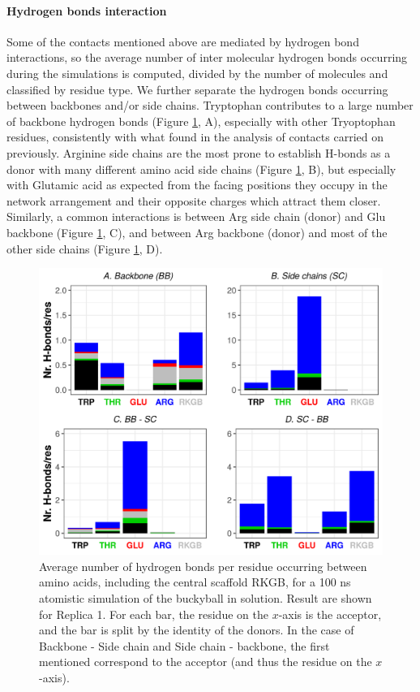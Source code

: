 \paragraph{Hydrogen bonds interaction} Some of the contacts mentioned above are mediated by hydrogen bond interactions, so the average number of inter molecular hydrogen bonds occurring during the simulations is computed, divided by the number of molecules and classified by residue type.
We further separate the hydrogen bonds occurring between backbones and/or side chains. Tryptophan contributes to a large number of backbone hydrogen bonds (Figure \ref{fig:BTI_hbonds}, A), especially with other Tryoptophan residues, consistently with what found in the analysis of contacts carried on previously. Arginine side chains are the most prone to establish H-bonds as a donor with many different amino acid side chains (Figure \ref{fig:BTI_hbonds}, B), but especially with Glutamic acid as expected from the facing positions they occupy in the network arrangement and their opposite charges which attract them closer.
%
Similarly, a common interactions is between Arg side chain (donor) and Glu backbone (Figure \ref{fig:BTI_hbonds}, C), and between Arg backbone (donor) and most of the other side chains (Figure \ref{fig:BTI_hbonds}, D).
\begin{figure}[t]
\centering
\includegraphics[width=0.85\linewidth]{3results_capsule/pics/Hb_all.png} 
\caption[Hydrogen bonds between molecules in the buckyball]{Average number of hydrogen bonds per residue occurring between amino acids, including the central scaffold RKGB, for a 100 ns atomistic simulation of the buckyball in solution. Result are shown for Replica 1. For each bar, the residue on the $x$-axis is the acceptor, and the bar is split by the identity of the donors. In the case of Backbone - Side chain and Side chain - backbone, the first mentioned correspond to the acceptor (and thus the residue on the $x$-axis).}
\label{fig:BTI_hbonds}
\end{figure}

